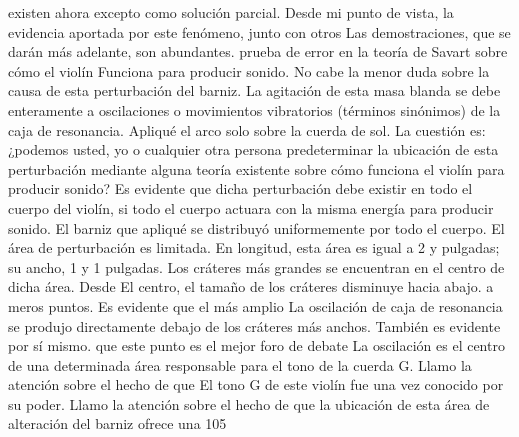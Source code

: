 existen ahora
excepto como solución parcial.
Desde mi punto de vista, la evidencia aportada
por este fenómeno, junto con otros
Las demostraciones, que se darán más adelante, son abundantes.
prueba de error en la teoría de Savart sobre cómo el violín
Funciona para producir sonido.
No cabe la menor duda sobre la causa de esta perturbación del barniz. La agitación de esta masa blanda se debe enteramente a oscilaciones o movimientos vibratorios (términos sinónimos) de la caja de resonancia. Apliqué el arco solo sobre la cuerda de sol. La cuestión es: ¿podemos usted, yo o cualquier otra persona predeterminar la ubicación de esta perturbación mediante alguna teoría existente sobre cómo funciona el violín para producir sonido? Es evidente que dicha perturbación debe existir en todo el cuerpo del violín, si todo el cuerpo actuara con la misma energía para producir sonido. El barniz que apliqué se distribuyó uniformemente por todo el cuerpo. El área de perturbación es limitada. En longitud, esta área es igual a
2 y pulgadas; su ancho, 1 y 1 pulgadas. Los cráteres más grandes se encuentran en el centro de dicha área. Desde
El centro, el tamaño de los cráteres disminuye hacia abajo.
a meros puntos. Es evidente que el más amplio
La oscilación de caja de resonancia se produjo directamente debajo de los cráteres más anchos. También es evidente por sí mismo.
que este punto es el mejor foro de debate
La oscilación es el centro de una determinada área responsable
para el tono de la cuerda G. Llamo la atención sobre el hecho de que
El tono G de este violín fue una vez conocido por su
poder. Llamo la atención sobre el hecho de que la ubicación de esta área de alteración del barniz ofrece una
105

